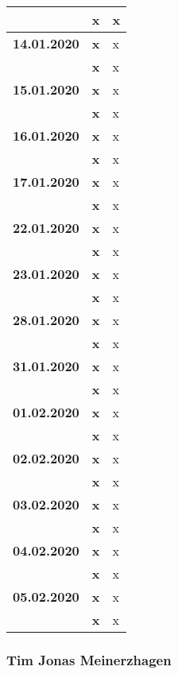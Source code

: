 {\begin{longtable}{|l|l|p{11cm}|}
			& \textbf{\hfill x} & x
		\\ \hline \textbf{14.01.2020}
			& \textbf{\hfill x} & x \\\cline{2-3}
			& \textbf{\hfill x} & x
		\\ \hline \textbf{15.01.2020}
			& \textbf{\hfill x} & x \\\cline{2-3}
			& \textbf{\hfill x} & x
		\\ \hline \textbf{16.01.2020}
			& \textbf{\hfill x} & x \\\cline{2-3}
			& \textbf{\hfill x} & x
		\\ \hline \textbf{17.01.2020}
			& \textbf{\hfill x} & x \\\cline{2-3}
			& \textbf{\hfill x} & x
		\\ \hline \textbf{22.01.2020}
			& \textbf{\hfill x} & x \\\cline{2-3}
			& \textbf{\hfill x} & x
		\\ \hline \textbf{23.01.2020}
			& \textbf{\hfill x} & x \\\cline{2-3}
			& \textbf{\hfill x} & x
		\\ \hline \textbf{28.01.2020}
			& \textbf{\hfill x} & x \\\cline{2-3}
			& \textbf{\hfill x} & x
		\\ \hline \textbf{31.01.2020}
			& \textbf{\hfill x} & x \\\cline{2-3}
			& \textbf{\hfill x} & x
		\\ \hline \textbf{01.02.2020}
			& \textbf{\hfill x} & x \\\cline{2-3}
			& \textbf{\hfill x} & x
		\\ \hline \textbf{02.02.2020}
			& \textbf{\hfill x} & x \\\cline{2-3}
			& \textbf{\hfill x} & x
		\\ \hline \textbf{03.02.2020}
			& \textbf{\hfill x} & x \\\cline{2-3}
			& \textbf{\hfill x} & x
		\\ \hline \textbf{04.02.2020}
			& \textbf{\hfill x} & x \\\cline{2-3}
			& \textbf{\hfill x} & x
		\\ \hline \textbf{05.02.2020}
			& \textbf{\hfill x} & x \\\cline{2-3}
			& \textbf{\hfill x} & x \\
		\hline\hline
	\end{longtable}
}

\clearpage

\subsubsection{Tim Jonas Meinerzhagen}

